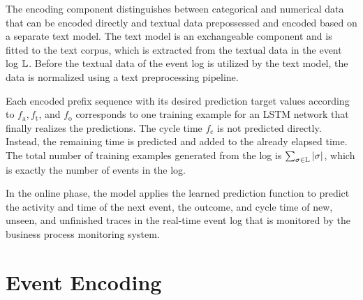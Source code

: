 The encoding component distinguishes between categorical and numerical data that can be encoded directly and textual data prepossessed and encoded based on a separate text model.
The text model is an exchangeable component and is fitted to the text corpus, which is extracted from the textual data in the event log $\mathbb{L}$.
Before the textual data of the event log is utilized by the text model, the data is normalized using a text preprocessing pipeline.

Each encoded prefix sequence with its desired prediction target values according to $f_\mathrm{a}, f_\mathrm{t}$, and $f_\mathrm{o}$ corresponds to one training example for an LSTM network that finally realizes the predictions.
The cycle time $f_\mathrm{c}$ is not predicted directly.
Instead, the remaining time is predicted and added to the already elapsed time.
The total number of training examples generated from the log is $\sum_{\sigma \in \mathbb{L}}|\sigma|$, which is exactly the number of events in the log.

In the online phase, the model applies the learned prediction function to predict the activity and time of the next event, the outcome, and cycle time of new, unseen, and unfinished traces in the real-time event log that is monitored by the business process monitoring system.

\section{Event Encoding}\label{sec:event}

